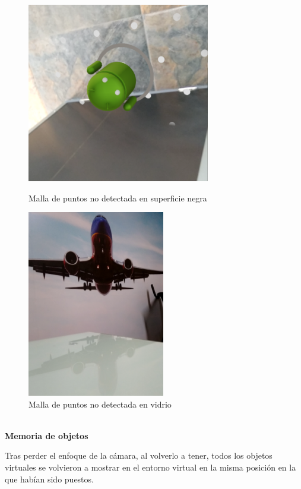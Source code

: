 \begin{figure}[H]
	\begin{minipage}{0.48\textwidth}
		\centering
		\includegraphics[width=8cm]{desarrollo/secciones/pruebas/motog6/img/SUPERFICIENEGRA.png}
		\caption{Malla de puntos no detectada en superficie negra}
		\label{fig:motog6supnegra}
	\end{minipage}\hfill
	\begin{minipage}{0.48\textwidth}
		\centering
		\includegraphics[width=6cm]{desarrollo/secciones/pruebas/motog6/img/VIDRIO.png}
		\caption{Malla de puntos no detectada en vidrio}
		\label{fig:motog6vidrio}
	\end{minipage}\hfill
\end{figure}

\textbf{\\Memoria de objetos} \par
Tras perder el enfoque de la cámara, al volverlo a tener, todos los objetos virtuales se volvieron a mostrar en el entorno virtual en la misma posición en la que habían sido puestos.

